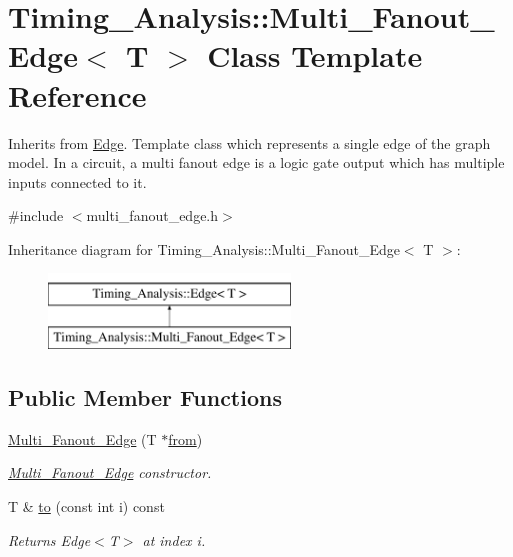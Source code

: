 \hypertarget{classTiming__Analysis_1_1Multi__Fanout__Edge}{\section{Timing\-\_\-\-Analysis\-:\-:Multi\-\_\-\-Fanout\-\_\-\-Edge$<$ T $>$ Class Template Reference}
\label{classTiming__Analysis_1_1Multi__Fanout__Edge}
}


Inherits from \hyperlink{classTiming__Analysis_1_1Edge}{Edge}. Template class which represents a single edge of the graph model. In a circuit, a multi fanout edge is a logic gate output which has multiple inputs connected to it.  




{\ttfamily \#include $<$multi\-\_\-fanout\-\_\-edge.\-h$>$}

Inheritance diagram for Timing\-\_\-\-Analysis\-:\-:Multi\-\_\-\-Fanout\-\_\-\-Edge$<$ T $>$\-:\begin{figure}[H]
\begin{center}
\leavevmode
\includegraphics[height=2.000000cm]{classTiming__Analysis_1_1Multi__Fanout__Edge}
\end{center}
\end{figure}
\subsection*{Public Member Functions}
\begin{DoxyCompactItemize}
\item 
\hyperlink{classTiming__Analysis_1_1Multi__Fanout__Edge_a877f7672fb4fbabf49943fd3c86b7f59}{Multi\-\_\-\-Fanout\-\_\-\-Edge} (T $\ast$\hyperlink{classTiming__Analysis_1_1Edge_a47020ea89fd9fde438adc814a731a23d}{from})
\begin{DoxyCompactList}\small\item\em \hyperlink{classTiming__Analysis_1_1Multi__Fanout__Edge}{Multi\-\_\-\-Fanout\-\_\-\-Edge} constructor. \end{DoxyCompactList}\item 
T \& \hyperlink{classTiming__Analysis_1_1Multi__Fanout__Edge_a77ac79088e9ef11d222e777e2963f676}{to} (const int i) const 
\begin{DoxyCompactList}\small\item\em Returns Edge$<$\-T$>$ at index i. \end{DoxyCompactList}\end{DoxyCompactItemize}
